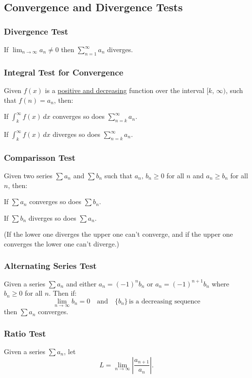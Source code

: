 \documentclass[12pt]{article}
\begin{document}
\subsection{Convergence and Divergence Tests}
\subsubsection{Divergence Test}
If $\displaystyle \lim_{n \to \infty} a_n \ne 0$ then $\displaystyle \sum_{n=1}^\infty a_n$ diverges.

\subsubsection{Integral Test for Convergence}
Given $f(x)$ is a \underline{positive and decreasing} function over the interval $[k, \, \infty)$, such that $f(n) = a_n$, then:

\noindent If $\displaystyle \int_k^\infty f(x) \, dx$ converges so does $\displaystyle \sum_{n=k}^\infty a_n$.

\noindent If $\displaystyle \int_k^\infty f(x) \, dx$ diverges so does $\displaystyle \sum_{n=k}^\infty a_n$.

\subsubsection{Comparisson Test}
Given two series $\displaystyle \sum a_n$ and $\displaystyle \sum b_n$ such that $a_n, \, b_n \ge 0$ for all $n$ and $a_n \ge b_n$ for all $n$, then:

\noindent If $\displaystyle \sum a_n$ converges so does $\displaystyle \sum b_n$.

\noindent If $\displaystyle \sum b_n$ diverges so does $\displaystyle \sum a_n$.

\noindent (If the lower one diverges the upper one can't converge, and if the upper one converges the lower one can't diverge.)

\subsubsection{Alternating Series Test}
Given a series $\displaystyle \sum a_n$ and either $a_n = (-1)^n b_n$ or $a_n = (-1)^{n+1} b_n$ where $b_n \ge 0$ for all $n$. Then if:
\[ \lim_{n \to \infty} b_n = 0 \quad \text{and} \quad \{b_n\} \, \text{is a decreasing sequence} \]
then $\displaystyle \sum a_n$ converges.

\subsubsection{Ratio Test}
\noindent Given a series $\displaystyle \sum a_n$, let
\[ L = \lim_{n \to \infty} \left| \frac{a_{n+1}}{a_n} \right|. \]
\end{document}
